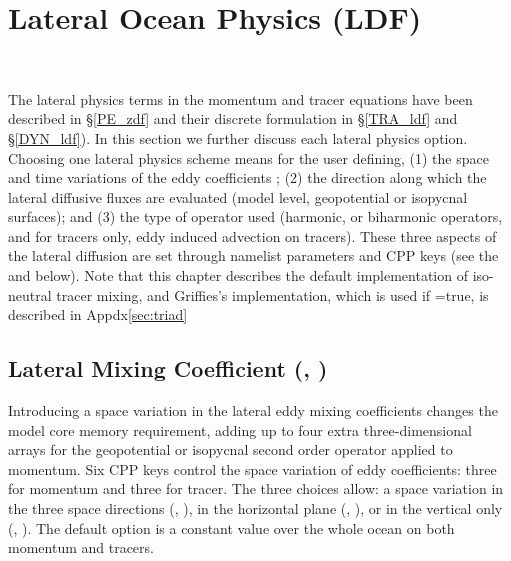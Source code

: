 
\chapter{Lateral Ocean Physics (LDF)}
\label{LDF}
\minitoc


\newpage
$\ $\newline    %


The lateral physics terms in the momentum and tracer equations have been 
described in \S\ref{PE_zdf} and their discrete formulation in \S\ref{TRA_ldf} 
and \S\ref{DYN_ldf}). In this section we further discuss each lateral physics option. 
Choosing one lateral physics scheme means for the user defining, (1) the space 
and time variations of the eddy coefficients ; (2) the direction along which the 
lateral diffusive fluxes are evaluated (model level, geopotential or isopycnal 
surfaces); and (3) the type of operator used (harmonic, or biharmonic operators, 
and for tracers only, eddy induced advection on tracers). These three aspects 
of the lateral diffusion are set through namelist parameters and CPP keys 
(see the \textit{} and \textit{} below). Note
that this chapter describes the default implementation of iso-neutral
tracer mixing, and Griffies's implementation, which is used if
=true, is described in Appdx\ref{sec:triad}



\section [Lateral Mixing Coefficient (\textit{ldftra}, \textit{ldfdyn})] 
		  {Lateral Mixing Coefficient (, ) }
\label{LDF_coef}


Introducing a space variation in the lateral eddy mixing coefficients changes 
the model core memory requirement, adding up to four extra three-dimensional 
arrays for the geopotential or isopycnal second order operator applied to 
momentum. Six CPP keys control the space variation of eddy coefficients: 
three for momentum and three for tracer. The three choices allow: 
a space variation in the three space directions (,  ), 
in the horizontal plane (,  ), 
or in the vertical only (,  ). 
The default option is a constant value over the whole ocean on both momentum and tracers. 
   
